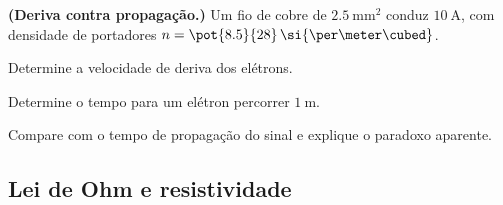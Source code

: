 \begin{questao}[4]{}

\textbf{(Deriva contra propagação.)} Um fio de cobre de
$\SI{2.5}{\milli\meter\squared}$ conduz $\SI{10}{\ampere}$, com densidade de
portadores $n=\pot{8.5}{28}\,\si{\per\meter\cubed}$.
\begin{itensq}
\item Determine a velocidade de deriva dos elétrons.
\item Determine o tempo para um elétron percorrer $\SI{1}{\meter}$.
\item Compare com o tempo de propagação do sinal e explique o paradoxo
      aparente.
\end{itensq}


\end{questao}


\subsection{Lei de Ohm e resistividade}

